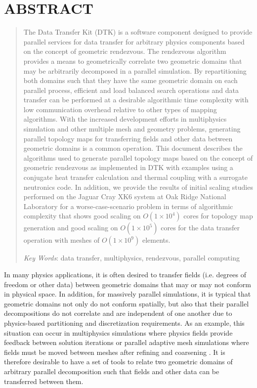 \documentclass{mc2013}
\begin{document}
\section*{ABSTRACT} 
\begin{quote}
\begin{small}
The Data Transfer Kit (DTK) is a software component designed to
provide parallel services for data transfer for arbitrary physics
components based on the concept of geometric rendezvous. The
rendezvous algorithm provides a means to geometrically correlate two
geometric domains that may be arbitrarily decomposed in a parallel
simulation. By repartitioning both domains such that they have the
same geometric domain on each parallel process, efficient and load
balanced search operations and data transfer can be performed at a
desirable algorithmic time complexity with low communication overhead
relative to other types of mapping algorithms. With the increased
development efforts in multiphysics simulation and other multiple mesh
and geometry problems, generating parallel topology maps for
transferring fields and other data between geometric domains is a
common operation. This document describes the algorithms used to
generate parallel topology maps based on the concept of geometric
rendezvous as implemented in DTK with examples using a conjugate heat
transfer calculation and thermal coupling with a surrogate neutronics
code. In addition, we provide the results of initial scaling studies
performed on the Jaguar Cray XK6 system at Oak Ridge National
Laboratory for a worse-case-scenario problem in terms of algorithmic
complexity that shows good scaling on $O(1 \times 10^4)$ cores for topology map
generation and good scaling on $O(1 \times 10^5)$ cores for the data transfer
operation with meshes of $O(1 \times 10^9)$ elements.


\emph{Key Words}: data transfer, multiphysics, rendezvous, parallel
computing
\end{small} 
\end{quote}

\setlength{\baselineskip}{14pt}
\normalsize

\label{sec:intro}

In many physics applications, it is often desired to transfer fields
(i.e. degrees of freedom or other data) between geometric domains that
may or may not conform in physical space. In addition, for massively
parallel simulations, it is typical that geometric domains not only do
not conform spatially, but also that their parallel decompositions do
not correlate and are independent of one another due to physics-based
partitioning and discretization requirements. As an example, this
situation can occur in multiphysics simulations where physics fields
provide feedback between solution iterations \cite{Tautges_2009_2} or
parallel adaptive mesh simulations where fields must be moved between
meshes after refining and coarsening \cite{Stewart_2004}. It is
therefore desirable to have a set of tools to relate two geometric
domains of arbitrary parallel decomposition such that fields and other
data can be transferred between them.
\end{document}
